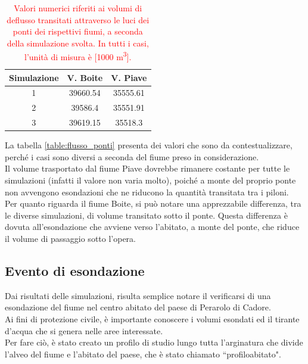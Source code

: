 \begin{table}[hbt]\centering
    \caption{\textcolor{red}{Valori numerici riferiti ai volumi di deflusso transitati attraverso le luci dei ponti dei rispettivi fiumi, a seconda della simulazione svolta. In tutti i casi, l'unità di misura è [1000 \unit{m^3}].}}
    \begin{tabular}{ccc}
    \toprule
    Simulazione & V. Boite & V. Piave \\
    \midrule
    1 & 39660.54 & 35555.61 \\
    2 & 39586.4 & 35551.91 \\
    3 & 39619.15 & 35518.3  \\
    \bottomrule
    \end{tabular}
    \label{table:flusso_ponti}
    \end{table}

La tabella \eqref{table:flusso_ponti} presenta dei valori che sono da contestualizzare, perché i casi sono diversi a seconda del fiume preso in considerazione.\\
Il volume trasportato dal fiume Piave dovrebbe rimanere costante per tutte le simulazioni (infatti il valore non varia molto), poiché a monte del proprio ponte non avvengono esondazioni che ne riducono la quantità transitata tra i piloni.\\
Per quanto riguarda il fiume Boite, si può notare una apprezzabile differenza, tra le diverse simulazioni, di volume transitato sotto il ponte. Questa differenza è dovuta all'esondazione che avviene verso l'abitato, a monte del ponte, che riduce il volume di passaggio sotto l'opera.

\subsection{Evento di esondazione}
Dai risultati delle simulazioni, risulta semplice notare il verificarsi di una esondazione del fiume nel centro abitato del paese di Perarolo di Cadore.\\
Ai fini di protezione civile, è importante conoscere i volumi esondati ed il tirante d'acqua che si genera nelle aree interessate.\\
Per fare ciò, è stato creato un profilo di studio lungo tutta l'arginatura che divide l'alveo del fiume e l'abitato del paese, che è stato chiamato ``profilo\textunderscore abitato".

